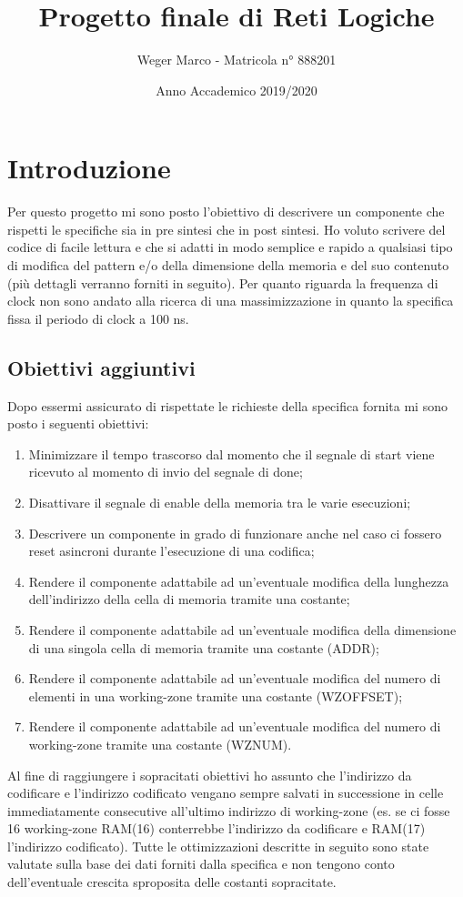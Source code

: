 \documentclass{article}
\begin{document}
\title{Progetto finale di Reti Logiche}
\author{Weger Marco - Matricola n° 888201}
\date{Anno Accademico 2019/2020}
\maketitle

\tableofcontents

\newpage
{}
\section{Introduzione}
Per questo progetto mi sono posto l'obiettivo di descrivere un componente che rispetti le specifiche sia in pre sintesi che in post sintesi.
Ho voluto scrivere del codice di facile lettura e che si adatti in modo semplice e rapido a qualsiasi tipo di modifica del pattern e/o della dimensione della memoria e del suo contenuto (più dettagli verranno forniti in seguito).
Per quanto riguarda la frequenza di clock non sono andato alla ricerca di una massimizzazione in quanto la specifica fissa il periodo di clock a 100 ns.
\subsection{Obiettivi aggiuntivi}
Dopo essermi assicurato di rispettate le richieste della specifica fornita mi sono posto i seguenti obiettivi:
\begin{enumerate}
	\item Minimizzare il tempo trascorso dal momento che il segnale di start viene ricevuto al momento di invio del segnale di done;
	\item Disattivare il segnale di enable della memoria tra le varie esecuzioni;
	\item Descrivere un componente in grado di funzionare anche nel caso ci fossero reset asincroni durante l'esecuzione di una codifica;
	\item Rendere il componente adattabile ad un'eventuale modifica della lunghezza dell'indirizzo della cella di memoria tramite una costante;
	\item Rendere il componente adattabile ad un'eventuale modifica della dimensione di una singola cella di memoria tramite una costante (ADDR);
	\item Rendere il componente adattabile ad un'eventuale modifica del numero di elementi in una working-zone tramite una costante (WZ\textunderscore OFFSET);
	\item Rendere il componente adattabile ad un'eventuale modifica del numero di working-zone tramite una costante (WZ\textunderscore NUM).
\end{enumerate}
Al fine di raggiungere i sopracitati obiettivi ho assunto che l'indirizzo da codificare e l'indirizzo codificato vengano sempre salvati in successione in celle immediatamente consecutive all'ultimo indirizzo di working-zone (es. se ci fosse 16 working-zone RAM(16) conterrebbe l'indirizzo da codificare e RAM(17) l'indirizzo codificato).
Tutte le ottimizzazioni descritte in seguito sono state valutate sulla base dei dati forniti dalla specifica e non tengono conto dell'eventuale crescita sproposita delle costanti sopracitate.
\end{document}
